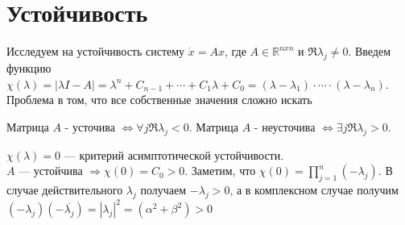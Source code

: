 \section{Устойчивость}
Исследуем на устойчивость систему $\dot{x} = Ax$, где $A \in \mathbb{R}^{nxn}$ и $\Re{\lambda_j} \neq 0$. Введем функцию $\chi(\lambda) = \left|\lambda I - A\right| = \lambda^n+C_{n-1} + \cdots + C_1 \lambda + C_0 = (\lambda - \lambda_1)\cdot \cdots \cdot (\lambda - \lambda_n)$. Проблема в том, что все собственные значения  сложно искать
\begin{definition}
	Матрица $A$ - усточива $\Leftrightarrow \forall j \Re{\lambda_j} < 0$. 
	Матрица $A$ - неусточива $\Leftrightarrow \exists j \Re{\lambda_j} > 0$. 	
\end{definition}
$\chi(\lambda) = 0$ --- критерий асимптотической устойчивости.\\
$A$ --- устойчива $\Rightarrow \chi(0) = C_0 > 0$. Заметим, что $\chi(0) = \prod_{j=1}^{n}\left(-\lambda_j\right)$. В случае действительного $\lambda_j$ получаем $-\lambda_j  > 0$, а в комплексном случае получим $(-\lambda_j)(-\overline{ \lambda_j }) = |\lambda_j|^2=(\alpha^2+\beta^2)>0$\\
